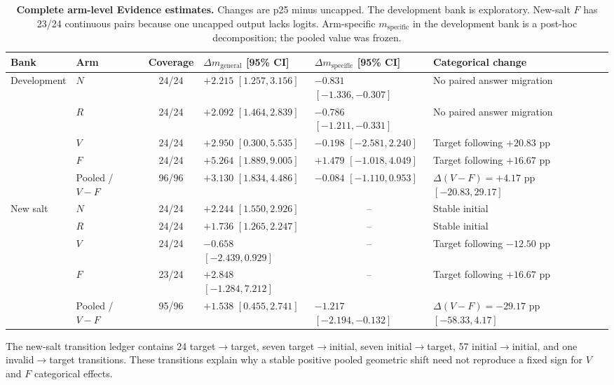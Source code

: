 \documentclass[letterpaper]{article}
\begin{document}
\begin{table}[t]
\centering
\small
\begin{tabular}{llcL{3.15cm}L{3.15cm}L{3.8cm}}
\toprule
Bank & Arm & Coverage & $\Delta m_{\mathrm{general}}$ [95\% CI] & $\Delta m_{\mathrm{specific}}$ [95\% CI] & Categorical change \\
\midrule
Development & $N$ & 24/24 & $+2.215$ $[1.257,3.156]$ & $-0.831$ $[-1.336,-0.307]$ & No paired answer migration \\
& $R$ & 24/24 & $+2.092$ $[1.464,2.839]$ & $-0.786$ $[-1.211,-0.331]$ & No paired answer migration \\
& $V$ & 24/24 & $+2.950$ $[0.300,5.535]$ & $-0.198$ $[-2.581,2.240]$ & Target following $+20.83$ pp \\
& $F$ & 24/24 & $+5.264$ $[1.889,9.005]$ & $+1.479$ $[-1.018,4.049]$ & Target following $+16.67$ pp \\
& Pooled / $V-F$ & 96/96 & $+3.130$ $[1.834,4.486]$ & $-0.084$ $[-1.110,0.953]$ & $\Delta(V-F)=+4.17$ pp $[-20.83,29.17]$ \\
\midrule
New salt & $N$ & 24/24 & $+2.244$ $[1.550,2.926]$ &  & Stable initial \\
& $R$ & 24/24 & $+1.736$ $[1.265,2.247]$ &  & Stable initial \\
& $V$ & 24/24 & $-0.658$ $[-2.439,0.929]$ &  & Target following $-12.50$ pp \\
& $F$ & 23/24 & $+2.848$ $[-1.284,7.212]$ &  & Target following $+16.67$ pp \\
& Pooled / $V-F$ & 95/96 & $+1.538$ $[0.455,2.741]$ & $-1.217$ $[-2.194,-0.132]$ & $\Delta(V-F)=-29.17$ pp $[-58.33,4.17]$ \\
\bottomrule
\end{tabular}
\caption{\textbf{Complete arm-level Evidence estimates.} Changes are p25 minus uncapped.  The development bank is exploratory.  New-salt $F$ has 23/24 continuous pairs because one uncapped output lacks logits.  Arm-specific $m_{\mathrm{specific}}$ in the development bank is a post-hoc decomposition; the pooled value was frozen.}
\label{tab:supp-evidence}
\end{table}

The new-salt transition ledger contains 24 target$\rightarrow$target, seven target$\rightarrow$initial, seven initial$\rightarrow$target, 57 initial$\rightarrow$initial, and one invalid$\rightarrow$target transitions.  These transitions explain why a stable positive pooled geometric shift need not reproduce a fixed sign for $V$ and $F$ categorical effects.
\end{document}
